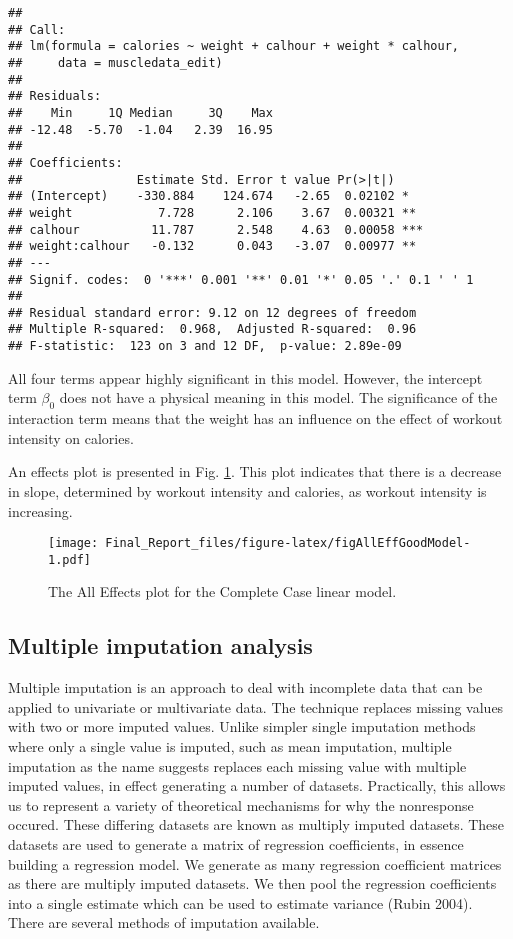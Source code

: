 \documentclass[]{article}
\theoremstyle{definition}
\theoremstyle{definition}
\theoremstyle{definition}
\theoremstyle{remark}
\begin{document}
\begin{verbatim}
## 
## Call:
## lm(formula = calories ~ weight + calhour + weight * calhour, 
##     data = muscledata_edit)
## 
## Residuals:
##    Min     1Q Median     3Q    Max 
## -12.48  -5.70  -1.04   2.39  16.95 
## 
## Coefficients:
##                Estimate Std. Error t value Pr(>|t|)    
## (Intercept)    -330.884    124.674   -2.65  0.02102 *  
## weight            7.728      2.106    3.67  0.00321 ** 
## calhour          11.787      2.548    4.63  0.00058 ***
## weight:calhour   -0.132      0.043   -3.07  0.00977 ** 
## ---
## Signif. codes:  0 '***' 0.001 '**' 0.01 '*' 0.05 '.' 0.1 ' ' 1
## 
## Residual standard error: 9.12 on 12 degrees of freedom
## Multiple R-squared:  0.968,  Adjusted R-squared:  0.96 
## F-statistic:  123 on 3 and 12 DF,  p-value: 2.89e-09
\end{verbatim}

All four terms appear highly significant in this model. However, the
intercept term \(\beta_0\) does not have a physical meaning in this
model. The significance of the interaction term means that the weight
has an influence on the effect of workout intensity on calories.

An effects plot is presented in Fig. \ref{fig:AllEffGoodModel}. This
plot indicates that there is a decrease in slope, determined by workout
intensity and calories, as workout intensity is increasing.

\begin{figure}[htbp]
\centering
\texttt{[image: Final\_Report\_files/figure-latex/figAllEffGoodModel-1.pdf]}
\caption{\label{fig:figAllEffGoodModel}\label{fig:AllEffGoodModel}The All
Effects plot for the Complete Case linear model.}
\end{figure}

\subsection{Multiple imputation
analysis}\label{multiple-imputation-analysis}

Multiple imputation is an approach to deal with incomplete data that can
be applied to univariate or multivariate data. The technique replaces
missing values with two or more imputed values. Unlike simpler single
imputation methods where only a single value is imputed, such as mean
imputation, multiple imputation as the name suggests replaces each
missing value with multiple imputed values, in effect generating a
number of datasets. Practically, this allows us to represent a variety
of theoretical mechanisms for why the nonresponse occured. These
differing datasets are known as multiply imputed datasets. These
datasets are used to generate a matrix of regression coefficients, in
essence building a regression model. We generate as many regression
coefficient matrices as there are multiply imputed datasets. We then
pool the regression coefficients into a single estimate which can be
used to estimate variance (Rubin 2004). There are several methods of
imputation available.
\end{document}
